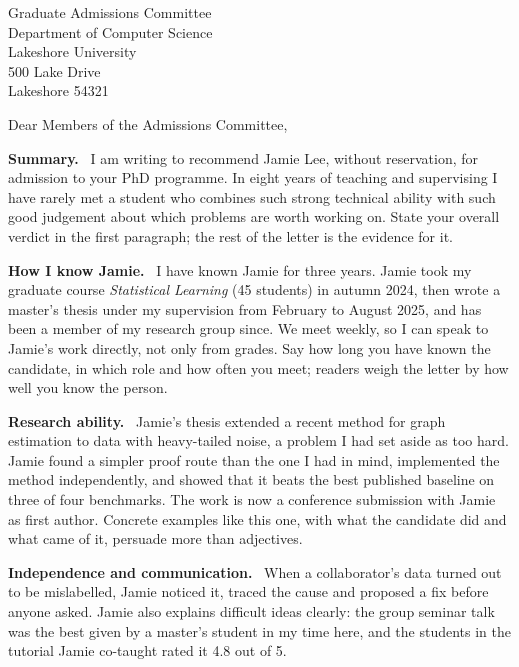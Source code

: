 \documentclass[paper=a4,fontsize=11pt,parskip=half,subject=underlined,
               fromrule=off,fromalign=left,backaddress=false,foldmarks=false,enlargefirstpage=true]{scrlttr2}
\newcommand*{\topic}[1]{\textbf{#1.}\ }
\begin{document}
\begin{letter}{Graduate Admissions Committee\\
               Department of Computer Science\\
               Lakeshore University\\
               500 Lake Drive\\
               Lakeshore 54321}

\opening{Dear Members of the Admissions Committee,}

\topic{Summary} I am writing to recommend Jamie Lee, without reservation, for admission to
your PhD programme. In eight years of teaching and supervising I have rarely met a student
who combines such strong technical ability with such good judgement about which problems
are worth working on. State your overall verdict in the first paragraph; the rest of the
letter is the evidence for it.

\topic{How I know Jamie} I have known Jamie for three years. Jamie took my graduate course
\emph{Statistical Learning} (45 students) in autumn 2024, then wrote a master's thesis under
my supervision from February to August 2025, and has been a member of my research group
since. We meet weekly, so I can speak to Jamie's work directly, not only from grades.
Say how long you have known the candidate, in which role and how often you meet; readers
weigh the letter by how well you know the person.

\topic{Research ability} Jamie's thesis extended a recent method for graph estimation to
data with heavy-tailed noise, a problem I had set aside as too hard. Jamie found a
simpler proof route than the one I had in mind, implemented the method independently, and
showed that it beats the best published baseline on three of four benchmarks. The work is
now a conference submission with Jamie as first author. Concrete examples like this one,
with what the candidate did and what came of it, persuade more than adjectives.

\topic{Independence and communication} When a collaborator's data turned out to be
mislabelled, Jamie noticed it, traced the cause and proposed a fix before anyone
asked. Jamie also explains difficult ideas clearly: the group seminar talk was the best
given by a master's student in my time here, and the students in the tutorial Jamie
co-taught rated it 4.8 out of 5.


\end{letter}
\end{document}
